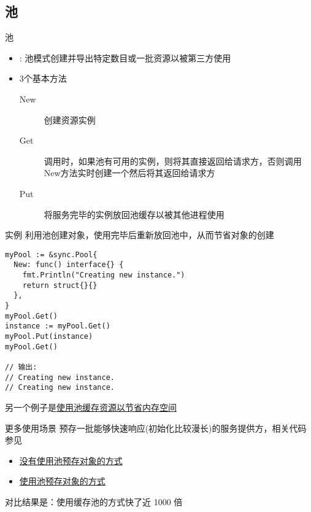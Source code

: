 \subsection{池\Pool }
\begin{frame}{池\Pool }
    \begin{itemize}
        \item {}: 池模式创建并导出特定数目或一批资源以被第三方使用
        \item 3个基本方法
            \begin{description}
                \item[New] 创建资源实例
                \item[Get] 调用时，如果池有可用的实例，则将其直接返回给请求方，否则调用New方法实时创建一个然后将其返回给请求方
                \item[Put] 将服务完毕的实例放回池缓存以被其他进程使用
            \end{description}
    \end{itemize}
\end{frame}

\begin{frame}[fragile]{实例}
    利用池创建对象，\alert{使用完毕后重新放回池中}，从而节省对象的创建
\begin{lstlisting}
myPool := &sync.Pool{
  New: func() interface{} {
    fmt.Println("Creating new instance.")
    return struct{}{}
  },
}
myPool.Get()
instance := myPool.Get()
myPool.Put(instance)
myPool.Get()

// 输出:
// Creating new instance.
// Creating new instance.
\end{lstlisting}

另一个例子是\href{https://github.com/sammyne/concurrency-in-go/blob/master/chapter03/sync.pkg/pool/basic2.go}{使用池缓存资源以节省内存空间}

\end{frame}

\begin{frame}{更多使用场景}
    预存一批能够快速响应(初始化比较漫长)的服务提供方，相关代码参见
    \begin{itemize}
        \item \href{https://github.com/sammyne/concurrency-in-go/blob/master/chapter03/sync.pkg/pool/slow_network_service_benchmark_test.go}{没有使用池预存对象的方式}
        \item \href{https://github.com/sammyne/concurrency-in-go/blob/master/chapter03/sync.pkg/pool/slow_network_service_benchmark_test.go}{使用池预存对象的方式}
    \end{itemize}

    对比结果是：使用缓存池的方式快了近 1000 倍
\end{frame}

